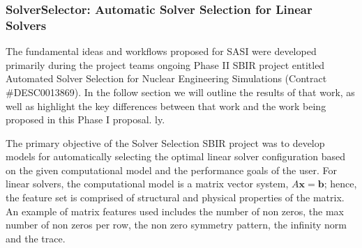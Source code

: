 \subsubsection{SolverSelector: Automatic Solver Selection for Linear Solvers} 
\label{sec:linearsolvers}

The fundamental ideas and workflows proposed for SASI were developed primarily during the project teams ongoing Phase II SBIR project entitled Automated Solver Selection for Nuclear Engineering Simulations (Contract \#DESC0013869). In the follow section we will outline the results of that work, as well as highlight the key differences between that work and the work being proposed in this Phase I proposal.  
ly. 

The primary objective of the Solver Selection SBIR project was to develop models for automatically selecting the optimal linear solver configuration based on the given computational model and the performance goals of the user. For linear solvers, the computational model is a matrix vector system, $A\mathbf{x} = \mathbf{b}$; hence, the feature set is comprised of structural and physical properties of the matrix. An example of matrix features used includes the number of non zeros, the max number of non zeros per row, the non zero symmetry pattern, the infinity norm and the trace.  

%


